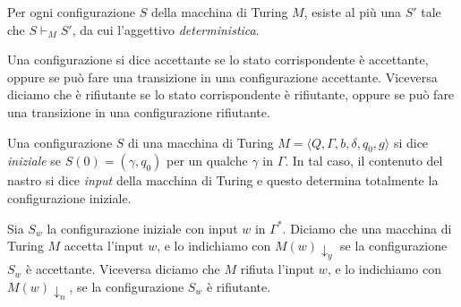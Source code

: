 \begin{osservazione}
 Per ogni configurazione $S$ della macchina di Turing $M$, esiste al più una
 $S'$ tale che $S \vdash_M S'$, da cui l'aggettivo \emph{deterministica}.
\end{osservazione}


\begin{definizione}
 Una configurazione si dice accettante se lo stato corrispondente è accettante,
 oppure se può fare una transizione in una configurazione accettante.
 Viceversa diciamo che è rifiutante se lo stato corrispondente è rifiutante,
 oppure se può fare una transizione in una configurazione rifiutante.
\end{definizione}

\begin{definizione}
 Una configurazione $S$ di una macchina di Turing
 $M=\langle Q, \Gamma, b, \delta, q_0, g \rangle$ si dice \emph{iniziale} se
 $S(0) = (\gamma, q_0)$ per un qualche $\gamma$ in $\Gamma$. In tal caso, il contenuto del nastro
 si dice \emph{input} della macchina di Turing e questo determina totalmente
 la configurazione iniziale.
\end{definizione}

\begin{definizione}
\label{def:accept-input}
 Sia $S_w$ la configurazione iniziale con input $w$ in $\Gamma^\ast$. Diciamo che
 una macchina di Turing $M$ accetta l'input $w$, e lo indichiamo con $M(w)\downarrow_y$
 se la configurazione $S_w$ è accettante. Viceversa diciamo che $M$
 rifiuta l'input $w$, e lo indichiamo con $M(w)\downarrow_n$, se
 la configurazione $S_w$ è rifiutante.
 
\end{definizione}

